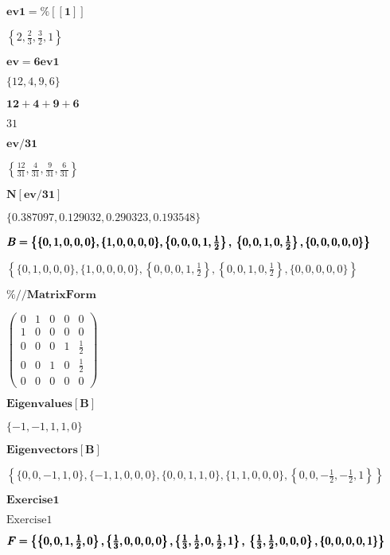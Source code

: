 \documentclass{article}
\begin{document}
\noindent\(\pmb{\text{ev1}=\%[[1]]}\)

\noindent\(\left\{2,\frac{2}{3},\frac{3}{2},1\right\}\)

\noindent\(\pmb{\text{ev}=6\text{ev1}}\)

\noindent\(\{12,4,9,6\}\)

\noindent\(\pmb{12+4+9+6}\)

\noindent\(31\)

\noindent\(\pmb{\text{ev}/31}\)

\noindent\(\left\{\frac{12}{31},\frac{4}{31},\frac{9}{31},\frac{6}{31}\right\}\)

\noindent\(\pmb{N[\text{ev}/31]}\)

\noindent\(\{0.387097,0.129032,0.290323,0.193548\}\)

\noindent\(\pmb{B=\left\{\{0,1,0,0,0\},\{1,0,0,0,0\},\left\{0,0,0,1,\frac{1}{2}\right\},\right.}\\
\pmb{\left.\left\{0,0,1,0,\frac{1}{2}\right\},\{0,0,0,0,0\}\right\}}\)

\noindent\(\left\{\{0,1,0,0,0\},\{1,0,0,0,0\},\left\{0,0,0,1,\frac{1}{2}\right\},\left\{0,0,1,0,\frac{1}{2}\right\},\{0,0,0,0,0\}\right\}\)

\noindent\(\pmb{\%\text{//}\text{MatrixForm}}\)

\noindent\(\left(
\begin{array}{ccccc}
 0 & 1 & 0 & 0 & 0 \\
 1 & 0 & 0 & 0 & 0 \\
 0 & 0 & 0 & 1 & \frac{1}{2} \\
 0 & 0 & 1 & 0 & \frac{1}{2} \\
 0 & 0 & 0 & 0 & 0
\end{array}
\right)\)

\noindent\(\pmb{\text{Eigenvalues}[B]}\)

\noindent\(\{-1,-1,1,1,0\}\)

\noindent\(\pmb{\text{Eigenvectors}[B]}\)

\noindent\(\left\{\{0,0,-1,1,0\},\{-1,1,0,0,0\},\{0,0,1,1,0\},\{1,1,0,0,0\},\left\{0,0,-\frac{1}{2},-\frac{1}{2},1\right\}\right\}\)

\noindent\(\pmb{\text{Exercise1}}\)

\noindent\(\text{Exercise1}\)

\noindent\(\pmb{F=\left\{\left\{0,0,1,\frac{1}{2},0\right\},\left\{\frac{1}{3},0,0,0,0\right\},\left\{\frac{1}{3},\frac{1}{2},0,\frac{1}{2},1\right\},\right.}\\
\pmb{\left.\left\{\frac{1}{3},\frac{1}{2},0,0,0\right\},\{0,0,0,0,1\}\right\}}\)
\end{document}
